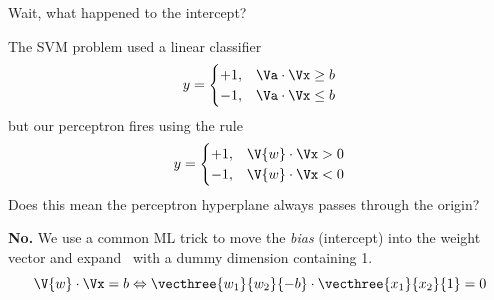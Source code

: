 \documentclass[9pt]{beamer}
\begin{document}
\begin{frame}{Wait, what happened to the intercept?}

The SVM problem used a linear classifier
\[ y = \begin{cases} +1, & \Va\cdot\Vx \ge b \\ -1, & \Va\cdot\Vx \le b \end{cases} \]
but our perceptron fires using the rule
\[ y = \begin{cases} +1, & \V{w}\cdot\Vx > 0 \\ -1, & \V{w}\cdot\Vx < 0 \end{cases} \]
Does this mean the perceptron hyperplane always passes through the origin?

\bigskip
\pause
\textbf{No.} We use a common ML trick to move the \emph{bias} (intercept) into the weight vector and expand \Vx\ with a dummy dimension containing 1.
\[ \V{w}\cdot\Vx = b \Leftrightarrow \vecthree{w_1}{w_2}{-b}\cdot\vecthree{x_1}{x_2}{1} = 0 \]

	
\end{frame}


\newcommand\hi{{$+1$}}
\newcommand\lo{{\color{red}$-1$}}
\newcommand\here{$\leftarrow$}
\end{document}
